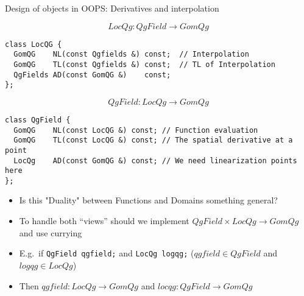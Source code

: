 \documentclass[9pt]{beamer}
\begin{document}
\begin{frame}[fragile]{Design of objects in OOPS: Derivatives and interpolation}

  $$ LocQg \colon QgField \rightarrow GomQg$$

\begin{lstlisting}
class LocQG { 
  GomQG    NL(const Qgfields &) const;  // Interpolation 
  GomQG    TL(const Qgfields &) const;  // TL of Interpolation  
  QgFields AD(const GomQG &)    const;
};
\end{lstlisting}


$$QgField\colon LocQg \rightarrow GomQg$$

\begin{lstlisting}
class QgField { 
  GomQG    NL(const LocQG &) const; // Function evaluation  
  GomQG    TL(const LocQG &) const; // The spatial derivative at a point
  LocQg    AD(const GomQG &) const; // We need linearization points here
};
\end{lstlisting}

\pause
\begin{itemize}
  \item Is this "Duality" between Functions and Domains something general?
\end{itemize}
\pause
\begin{itemize} 
  \item To handle both ``views'' should we implement $QgField \times LocQg \rightarrow GomQg$ and use currying
  \item E.g.\ if \lstinline|QgField qgfield;| and \lstinline|LocQg logqg;| ($qgfield \in QgField$  and  $logqg \in LocQg$)
  \item Then $qgfield\colon LocQg \rightarrow GomQg$ and $locqg\colon QgField \rightarrow GomQg$ 
\end{itemize} 

\end{frame}




\end{document}
